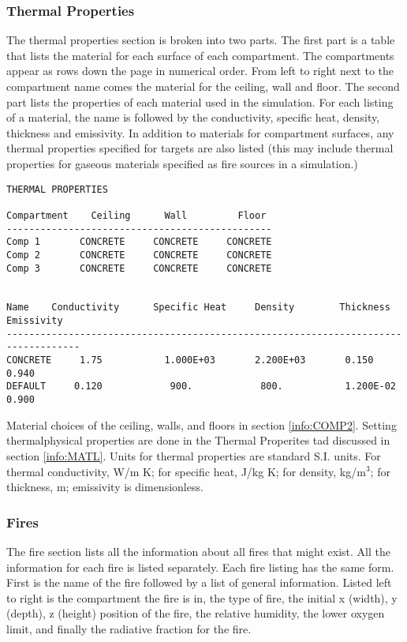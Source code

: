 \subsubsection{Thermal Properties}

The thermal properties section is broken into two parts.  The first part is a table that lists the material for each surface of each compartment.  The compartments appear as rows down the page in numerical order.  From left to right next to the compartment name comes the material for the ceiling, wall and floor.  The second part lists the properties of each material used in the simulation. For each listing of a material, the name is followed by the conductivity, specific heat, density, thickness and emissivity. In addition to materials for compartment surfaces, any thermal properties specified for targets are also listed (this may include thermal properties for gaseous materials specified as fire sources in a simulation.)

\begin{lstlisting}[basicstyle=\tiny]
THERMAL PROPERTIES

Compartment    Ceiling      Wall         Floor
-----------------------------------------------
Comp 1       CONCRETE     CONCRETE     CONCRETE
Comp 2       CONCRETE     CONCRETE     CONCRETE
Comp 3       CONCRETE     CONCRETE     CONCRETE


Name    Conductivity      Specific Heat     Density        Thickness     Emissivity
-----------------------------------------------------------------------------------
CONCRETE     1.75           1.000E+03       2.200E+03       0.150           0.940
DEFAULT     0.120            900.            800.           1.200E-02       0.900
\end{lstlisting}

Material choices of the ceiling, walls, and floors in section \ref{info:COMP2}. Setting thermalphysical properties are done in the Thermal Properites tad discussed in section \ref{info:MATL}. Units for thermal properties are standard S.I. units.  For thermal conductivity, W/m K; for specific heat, J/kg K; for density, kg/m$^3$; for thickness, m; emissivity is dimensionless.


\subsubsection{Fires}

The fire section lists all the information about all fires that might exist.  All the information for each fire is listed separately.   Each fire listing has the same form.  First is the name of the fire followed by a list of general information.  Listed left to right is the compartment the fire is in, the type of fire, the initial x (width), y (depth), z (height) position of the fire, the relative humidity, the lower oxygen limit, and finally the radiative fraction for the fire.

